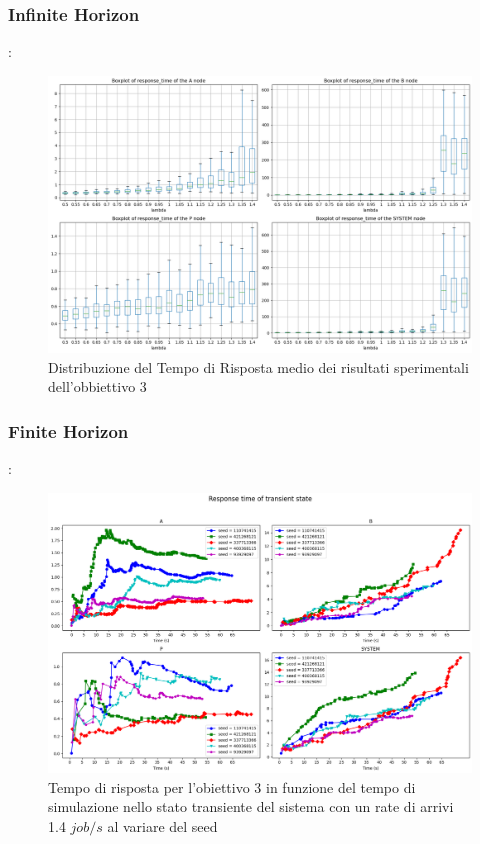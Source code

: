 \subsubsection{Infinite Horizon}
\begin{frame}{\subsecname: \subsubsecname}
    \begin{figure}
        \centering
        \includegraphics[width=0.75\linewidth]{figs/results/obj3/simulation/obj3_boxplot_rtime.png}
        \caption{Distribuzione del Tempo di Risposta medio dei risultati sperimentali dell’obbiettivo 3}
        \label{fig:enter-label}
    \end{figure}
\end{frame}

\subsubsection{Finite Horizon}
\begin{frame}{\subsecname: \subsubsecname}
    \begin{figure}
        \centering
        \includegraphics[width=0.75\linewidth]{figs/appendices/transient/obj3-transient-rtime-analitycal.png}
        \caption{Tempo di risposta per l’obiettivo 3 in funzione del tempo di simulazione nello stato transiente del sistema con un rate di arrivi 1.4 $job/s$ al variare del seed}
        \label{fig:enter-label}
    \end{figure}
\end{frame}

